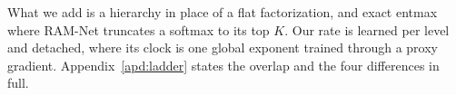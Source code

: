 What we add is a hierarchy in place of a flat factorization, and exact entmax where RAM-Net truncates a softmax to its top $K$. Our rate is learned per level and detached, where its clock is one global exponent trained through a proxy gradient. Appendix~\ref{apd:ladder} states the overlap and the four differences in full.

